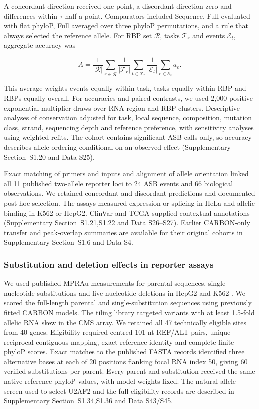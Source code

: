 \documentclass[webpdf,contemporary,large]{current_assets/oup-authoring-template}
\newcommand{\supsect}[1]{Supplementary Section~#1}
\begin{document}
A concordant direction received one point, a discordant direction zero and differences within $\tau$ half a point. Comparators included Sequence, Full evaluated with flat phyloP, Full averaged over three phyloP permutations, and a rule that always selected the reference allele. For RBP set $\mathcal R$, tasks $\mathcal T_r$ and events $\mathcal E_t$, aggregate accuracy was

\begin{equation}
A=\frac1{|\mathcal R|}\sum_{r\in\mathcal R}
\frac1{|\mathcal T_r|}\sum_{t\in\mathcal T_r}
\frac1{|\mathcal E_t|}\sum_{e\in\mathcal E_t}a_e.
\label{eq:allele_accuracy}
\end{equation}

This average weights events equally within task, tasks equally within RBP and RBPs equally overall. For accuracies and paired contrasts, we used 2,000 positive-exponential multiplier draws over RNA-region and RBP clusters. Descriptive analyses of conservation adjusted for task, local sequence, composition, mutation class, strand, sequencing depth and reference preference, with sensitivity analyses using weighted refits. The cohort contains significant ASB calls only, so accuracy describes allele ordering conditional on an observed effect (\supsect{S1.20} and Data S25).

Exact matching of primers and inputs and alignment of allele orientation linked all 11 published two-allele reporter loci to 24 ASB events and 66 biological observations. We retained concordant and discordant predictions and documented post hoc selection. The assays measured expression or splicing in HeLa and allelic binding in K562 or HepG2. ClinVar and TCGA supplied contextual annotations (\supsect{S1.21,S1.22} and Data S26--S27). Earlier CARBON-only transfer and peak-overlap summaries are available for their original cohorts in \supsect{S1.6} and Data S4.

\subsubsection{Substitution and deletion effects in reporter assays}\label{subsec:discovery_methods}\label{subsec:exact_edit_methods}

We used published MPRAu measurements for parental sequences, single-nucleotide substitutions and five-nucleotide deletions in HepG2 and K562 \citep{griesemer2021mprau}. We scored the full-length parental and single-substitution sequences using previously fitted CARBON models. The tiling library targeted variants with at least 1.5-fold allelic RNA skew in the CMS array. We retained all 47 technically eligible sites from 40 genes. Eligibility required centred 101-nt REF/ALT pairs, unique reciprocal contiguous mapping, exact reference identity and complete finite phyloP scores. Exact matches to the published FASTA records identified three alternative bases at each of 20 positions flanking focal RNA index 50, giving 60 verified substitutions per parent. Every parent and substitution received the same native reference phyloP values, with model weights fixed. The natural-allele screen used to select U2AF2 and the full eligibility records are described in \supsect{S1.34,S1.36} and Data S43/S45.
\end{document}
